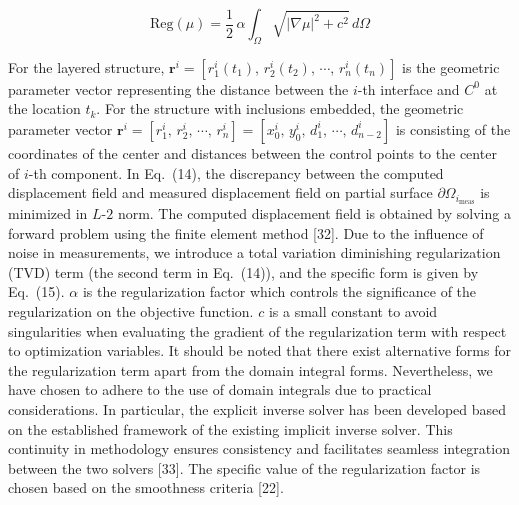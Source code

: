 \documentclass[11pt]{article}
\begin{document}
\vspace{1em}

\noindent
\begin{equation}
\text{Reg}(\mu) = \dfrac{1}{2}\,\alpha \int_{\Omega}
\sqrt{|\nabla\mu|^{2} + c^{2}}\, d\Omega
\end{equation}

\vspace{0.3em}

\noindent
For the layered structure,
$\mathbf{r}^i = \left[r^i_1(t_1),\, r^i_2(t_2),\, \cdots,\, r^i_n(t_n)\right]$
is the geometric parameter vector representing the distance between
the $i$-th interface and $C^0$ at the location $t_k$. For the
structure with inclusions embedded, the geometric parameter vector
$\mathbf{r}^i = \left[r^i_1,\, r^i_2,\, \cdots,\, r^i_n\right]
= \left[x^i_0,\, y^i_0,\, d^i_1,\, \cdots,\, d^i_{n-2}\right]$
is consisting of the coordinates of the center and distances between
the control points to the center of $i$-th component. In Eq.~(14),
the discrepancy between the computed displacement field and measured
displacement field on partial surface $\partial\Omega_{i_{\text{meas}}}$
is minimized in $L$-$2$ norm. The computed displacement field is
obtained by solving a forward problem using the finite element method
[32]. Due to the influence of noise in measurements, we introduce a
total variation diminishing regularization (TVD) term (the second
term in Eq.~(14)), and the specific form is given by Eq.~(15).
$\alpha$ is the regularization factor which controls the significance
of the regularization on the objective function. $c$ is a small
constant to avoid singularities when evaluating the gradient of the
regularization term with respect to optimization variables. It should
be noted that there exist alternative forms for the regularization
term apart from the domain integral forms. Nevertheless, we have
chosen to adhere to the use of domain integrals due to practical
considerations. In particular, the explicit inverse solver has been
developed based on the established framework of the existing
implicit inverse solver. This continuity in methodology ensures
consistency and facilitates seamless integration between the two
solvers [33]. The specific value of the regularization factor is
chosen based on the smoothness criteria [22].
\end{document}
